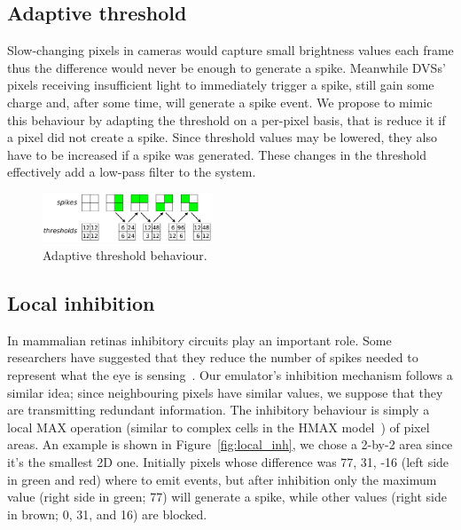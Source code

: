 \documentclass[conference]{IEEEtran}
\begin{document}
\subsection{Adaptive threshold}
\label{sec:adaptive_thresh}
Slow-changing pixels in cameras would capture small brightness values each frame thus the difference would never be enough to generate a spike. Meanwhile DVSs' pixels receiving insufficient light to immediately trigger a spike, still gain some charge and, after some time, will generate a spike event. We propose to mimic this behaviour by adapting the threshold on a per-pixel basis, that is reduce it if a pixel did not create a spike. Since threshold values may be lowered, they also have to be increased if a spike was generated. These changes in the threshold effectively add a low-pass filter to the system. 

%
\begin{figure}[hbt]
  \centering
  \includegraphics[width=0.45\textwidth]{adaptive_thresh_boxes}
  \caption{Adaptive threshold behaviour.}
  \label{fig:adpt_thresh}
\end{figure}

\subsection{Local inhibition}
\label{sec:local_inhibition}
In mammalian retinas inhibitory circuits play an important role. Some researchers have suggested that they reduce the number of spikes needed to represent what the eye is sensing~\cite{basab}. Our emulator's inhibition mechanism follows a similar idea; since neighbouring pixels have similar values, we suppose that they are transmitting redundant information. The inhibitory behaviour is simply a local MAX operation (similar to complex cells in the HMAX model~\cite{riesenhuber1999hierarchical}) of pixel areas. An example is shown in Figure~\ref{fig:local_inh}, we chose a 2-by-2 area since it's the smallest 2D one. Initially pixels whose difference was 77, 31, -16 (left side in green and red) where to emit events, but after inhibition only the maximum value (right side in green; 77) will generate a spike, while other values (right side in brown; 0, 31, and 16) are blocked.
\end{document}
